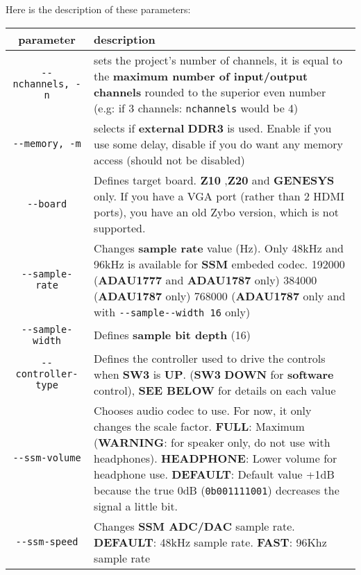 Here is the description of these parameters:\\
\begin{tabular}{|c|p{12cm}|}
  \toprule
parameter & description \\
\midrule
\texttt{-\/-nchannels,\ -n} & sets the project's number of channels, it
is equal to the \textbf{maximum number of input/output channels} rounded
to the superior even number (e.g: if 3 channels: \texttt{nchannels}
would be 4) \\
\texttt{-\/-memory,\ -m} & selects if \textbf{external} \textbf{DDR3} is
used. Enable if you use some delay, disable if you do want any memory
access (should not be disabled) \\
\texttt{-\/-board} & Defines target board. \textbf{Z10} ,\textbf{Z20}
and \textbf{GENESYS} only. If you have a VGA port (rather than 2 HDMI
ports), you have an old Zybo version, which is not supported. \\
\texttt{-\/-sample-rate} & Changes \textbf{sample rate} value (Hz). Only
48kHz and 96kHz is available for \textbf{SSM} embeded codec. 192000
(\textbf{ADAU1777} and \textbf{ADAU1787} only) 384000 (\textbf{ADAU1787}
only) 768000 (\textbf{ADAU1787} only and with
\texttt{-\/-sample-\/-width\ 16} only) \\
\texttt{-\/-sample-width} & Defines \textbf{sample bit depth}
(16\textbar24\textbar32) \\
\texttt{-\/-controller-type} & Defines the controller used to drive the
controls when \textbf{SW3} is \textbf{UP}. (\textbf{SW3} \textbf{DOWN}
for \textbf{software} control), \textbf{SEE BELOW} for details on each
value \\
\texttt{-\/-ssm-volume} & Chooses audio codec to use. For now, it only
changes the scale factor. \textbf{FULL}: Maximum (\textbf{WARNING}: for
speaker only, do not use with headphones). \textbf{HEADPHONE}: Lower
volume for headphone use. \textbf{DEFAULT}: Default value +1dB because
the true 0dB (\texttt{0b001111001}) decreases the signal a little
bit. \\
\texttt{-\/-ssm-speed} & Changes \textbf{SSM ADC/DAC} sample rate.
\textbf{DEFAULT}: 48kHz sample rate. \textbf{FAST}: 96Khz sample rate \\
\bottomrule
\end{tabular}

